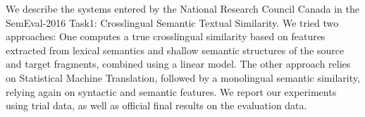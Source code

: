 We describe the systems entered by the National Research Council Canada in the SemEval-2016 Task1: Crosslingual Semantic Textual Similarity. We tried two approaches: One computes a true crosslingual similarity based on features extracted from lexical semantics and shallow semantic structures of the source and target fragments, combined using a linear model.  The other approach relies on Statistical Machine Translation, followed by a monolingual semantic similarity, relying again on syntactic and semantic features. We report our experiments using trial data, as well as official final results on the evaluation data.
